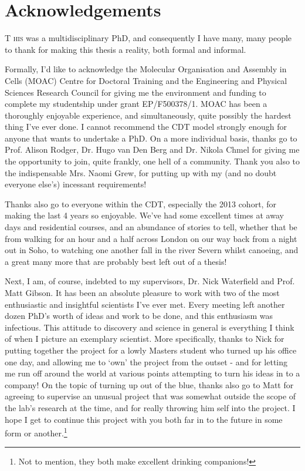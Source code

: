 \pagestyle{plain}
\chapter*{Acknowledgements}

\lettrine[lraise=0.0, nindent=0.1em, slope=1em]{T}{ his} was a multidisciplinary PhD, and consequently I have many, many people to thank for making this thesis a reality, both formal and informal.

Formally, I'd like to acknowledge the Molecular Organisation and Assembly in Cells (MOAC) Centre for Doctoral Training and the Engineering and Physical Sciences Research Council for giving me the environment and funding to complete my studentship under grant EP/F500378/1. MOAC has been a thoroughly enjoyable experience, and simultaneously, quite possibly the hardest thing I've ever done. I cannot recommend the CDT model strongly enough for anyone that wants to undertake a PhD. On a more individual basis, thanks go to Prof. Alison Rodger, Dr. Hugo van Den Berg and Dr. Nikola Chmel for giving me the opportunity to join, quite frankly, one hell of a community. Thank you also to the indispensable Mrs. Naomi Grew, for putting up with my (and no doubt everyone else's) incessant requirements!

Thanks also go to everyone within the CDT, especially the 2013 cohort, for making the last 4 years so enjoyable. We've had some excellent times at away days and residential courses, and an abundance of stories to tell, whether that be from walking for an hour and a half across London on our way back from a night out in Soho, to watching one another fall in the river Severn whilst canoeing, and a great many more that are probably best left out of a thesis!

Next, I am, of course, indebted to my supervisors, Dr. Nick Waterfield and Prof. Matt Gibson. It has been an absolute pleasure to work with two of the most enthusiastic and insightful scientists I've ever met. Every meeting left another dozen PhD's worth of ideas and work to be done, and this enthusiasm was infectious. This attitude to discovery and science in general is everything I think of when I picture an exemplary scientist. More specifically, thanks to Nick for putting together the project for a lowly Masters student who turned up his office one day, and allowing me to `own' the project from the outset - and for letting me run off around the world at various points attempting to turn his ideas in to a company! On the topic of turning up out of the blue, thanks also go to Matt for agreeing to supervise an unusual project that was somewhat outside the scope of the lab's research at the time, and for really throwing him self into the project. I hope I get to continue this project with you both far in to the future in some form or another.\footnote{Not to mention, they both make excellent drinking companions!}

